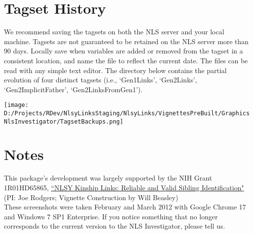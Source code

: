 \documentclass{article}\usepackage[]{graphicx}\usepackage[]{color}
\begin{document}
\section{Tagset History}
We recommend saving the tagsets on both the NLS server and your local machine.  Tagsets are not guaranteed to be retained on the NLS server more than 90 days.  Locally save when variables are added or removed from the tagset in a consistent location, and name the file to reflect the current date.  The files can be read with any simple text editor.  The directory below contains the partial evolution of four distinct tagsets (i.e., `Gen1Links', `Gen2Links', `Gen2ImplicitFather', `Gen2LinksFromGen1').

\texttt{[image: D:/Projects/RDev/NlsyLinksStaging/NlsyLinks/VignettesPreBuilt/GraphicsNlsInvestigator/TagsetBackups.png]}

\section{Notes}
This package's development was largely supported by the NIH Grant 1R01HD65865, \href{http://taggs.hhs.gov/AwardDetail.cfm?s_Award_Num=R01HD065865&n_Prog_Office_Code=50}{``NLSY Kinship Links: Reliable and Valid Sibling Identification"} (PI: Joe Rodgers; Vignette Construction by Will Beasley)\\


These screenshots were taken February and March 2012 with Google Chrome 17 and Windows 7 SP1 Enterprise.  If you notice something that no longer corresponds to the current version to the NLS Investigator, please tell us.
\end{document}
